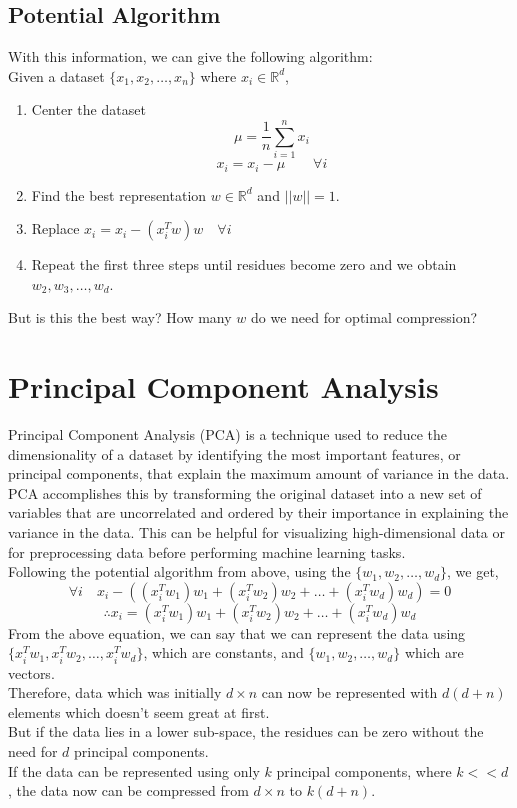 \documentclass[letterpaper,11pt]{article}
\begin{document}
\subsection{Potential Algorithm}
With this information, we can give the following algorithm:\\
Given a dataset $\{x_1, x_2, \ldots, x_n\}$ where $x_i \in \mathbb{R}^{d}$,
\begin{enumerate}
    \item Center the dataset
    $$
    \mu = \frac{1}{n} \sum _{i=1} ^{n} x_i
    $$
    $$
    x_i = x_i - \mu  \hspace{2em} \forall i
    $$
    \item Find the best representation $w \in \mathbb{R}^d$ and $||w|| = 1$.
    \item Replace $x_i = x_i - (x_i^Tw)w  \hspace{1em} \forall i$
    \item Repeat the first three steps until residues become zero and we obtain $w_2, w_3, \ldots, w_d$.
\end{enumerate}
But is this the best way? How many $w$ do we need for optimal compression?

\section{Principal Component Analysis}
Principal Component Analysis (PCA) is a technique used to reduce the dimensionality of a dataset by identifying the most important features, or principal components, that explain the maximum amount of variance in the data. PCA accomplishes this by transforming the original dataset into a new set of variables that are uncorrelated and ordered by their importance in explaining the variance in the data. This can be helpful for visualizing high-dimensional data or for preprocessing data before performing machine learning tasks. \\
Following the potential algorithm from above, using the $\{w_1, w_2, \ldots, w_d\}$, we get,
$$
\forall i \hspace{1em} x_i - ((x_i^Tw_1)w_1 + (x_i^Tw_2)w_2 + \ldots +(x_i^Tw_d)w_d) = 0
$$
$$
\therefore x_i = (x_i^Tw_1)w_1 + (x_i^Tw_2)w_2 + \ldots +(x_i^Tw_d)w_d
$$
From the above equation, we can say that we can represent the data using $\{x_i^Tw_1, x_i^Tw_2, \ldots, x_i^Tw_d\}$, which are constants, and $\{w_1, w_2, \ldots, w_d\}$ which are vectors.\\
Therefore, data which was initially $d \times n$ can now be represented with $d (d + n)$ elements which doesn't seem great at first. \\
But if the data lies in a lower sub-space, the residues can be zero without the need for $d$ principal components. \\
If the data can be represented using only $k$ principal components, where $k << d$, the data now can be compressed from $d \times n$ to $k(d + n)$.
\end{document}
